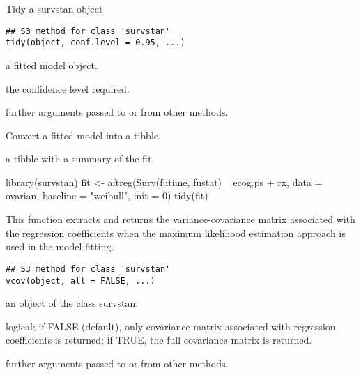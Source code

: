 \documentclass[letterpaper]{book}
\begin{document}
%
\begin{Description}\relax
Tidy a survstan object
\end{Description}
%
\begin{Usage}
\begin{verbatim}
## S3 method for class 'survstan'
tidy(object, conf.level = 0.95, ...)
\end{verbatim}
\end{Usage}
%
\begin{Arguments}
\begin{ldescription}
\item[\code{object}] a fitted model object.

\item[\code{conf.level}] the confidence level required.

\item[\code{...}] further arguments passed to or from other methods.
\end{ldescription}
\end{Arguments}
%
\begin{Details}\relax
Convert a fitted model into a tibble.
\end{Details}
%
\begin{Value}
a tibble with a summary of the fit.
\end{Value}
%
\begin{Examples}
\begin{ExampleCode}

library(survstan)
fit <- aftreg(Surv(futime, fustat) ~ ecog.ps + rx, data = ovarian, baseline = "weibull", init = 0)
tidy(fit)


\end{ExampleCode}
\end{Examples}
%
\begin{Description}\relax
This function extracts and returns the variance-covariance matrix associated with the regression coefficients when the maximum likelihood estimation approach is used in the model fitting.
\end{Description}
%
\begin{Usage}
\begin{verbatim}
## S3 method for class 'survstan'
vcov(object, all = FALSE, ...)
\end{verbatim}
\end{Usage}
%
\begin{Arguments}
\begin{ldescription}
\item[\code{object}] an object of the class survstan.

\item[\code{all}] logical; if FALSE (default), only covariance matrix associated with regression coefficients is returned; if TRUE, the full covariance matrix is returned.

\item[\code{...}] further arguments passed to or from other methods.
\end{ldescription}
\end{Arguments}
\end{document}
